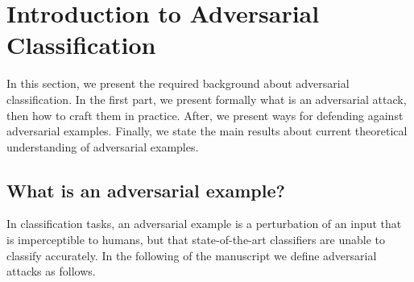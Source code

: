 \section{Introduction to Adversarial Classification}

In this section, we present the required background about adversarial classification. In the first part, we present formally what is an adversarial attack, then how to craft them in practice. After, we present ways for defending against adversarial examples. Finally, we state the main results about current theoretical understanding of adversarial examples. 
\subsection{What is an adversarial example?}

In classification tasks, an adversarial example is a perturbation of an input that is imperceptible to humans, but that state-of-the-art classifiers are unable to  classify accurately. In the following of the manuscript we define adversarial attacks as follows.


